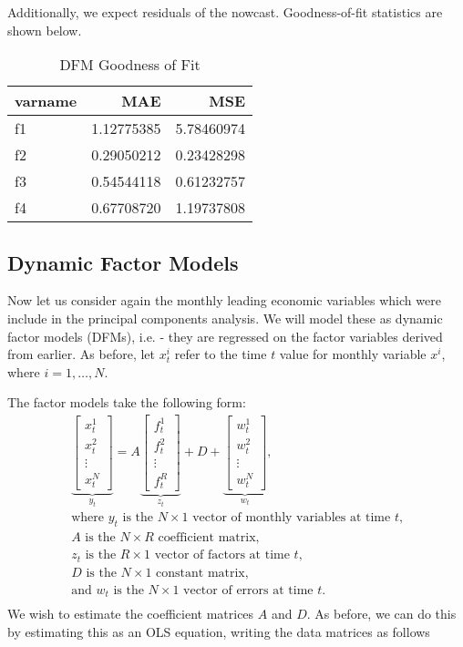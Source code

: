 \documentclass[11pt, letterpaper]{article}\usepackage[]{graphicx}\usepackage[]{color}
\begin{document}
Additionally, we expect residuals of the nowcast. Goodness-of-fit statistics are shown below.
\begin{table}[H]
\centering
\begingroup\footnotesize
\begin{tabular}{lrr}
  \hline
varname & MAE & MSE \\ 
  \hline
f1 & 1.12775385 & 5.78460974 \\ 
  f2 & 0.29050212 & 0.23428298 \\ 
  f3 & 0.54544118 & 0.61232757 \\ 
  f4 & 0.67708720 & 1.19737808 \\ 
   \hline
\end{tabular}
\endgroup
\caption{DFM Goodness of Fit} 
\end{table}




\subsection{Dynamic Factor Models}
Now let us consider again the monthly leading economic variables which were include in the principal components analysis. We will model these as dynamic factor models (DFMs), i.e. - they are regressed on the factor variables derived from earlier. As before, let $x^i_t$ refer to the time $t$ value for monthly variable $x^i$, where $i = 1, \dots, N$.

The factor models take the following form:
\begin{align*}
\underbrace{\begin{bmatrix}
	x^1_t\\
	x^2_t\\
	\vdots \\
	x^N_t
\end{bmatrix}}_{y_t}
=
A
\underbrace{\begin{bmatrix}
	f^1_{t}\\
	f^2_{t}\\
	\vdots \\
	f^R_{t}
\end{bmatrix}}_{z_t}
+
D 
+
\underbrace{\begin{bmatrix}
	w^1_t\\
	w^2_t\\
	\vdots\\
	w^N_t
\end{bmatrix}}_{w_t},\\
\text{where $y_t$ is the $N \times 1$ vector of monthly variables at time $t$,}\\
\text{$A$ is the $N \times R$ coefficient matrix,}\\
\text{$z_t$ is the $R \times 1$ vector of factors at time $t$,}\\
\text{$D$ is the $N \times 1$ constant matrix,}\\
\text{and $w_t$ is the $N \times 1$ vector of errors at time $t$.}\\
\end{align*}
We wish to estimate the coefficient matrices $A$ and $D$. As before, we can do this by estimating this as an OLS equation, writing the data matrices as follows
\end{document}
